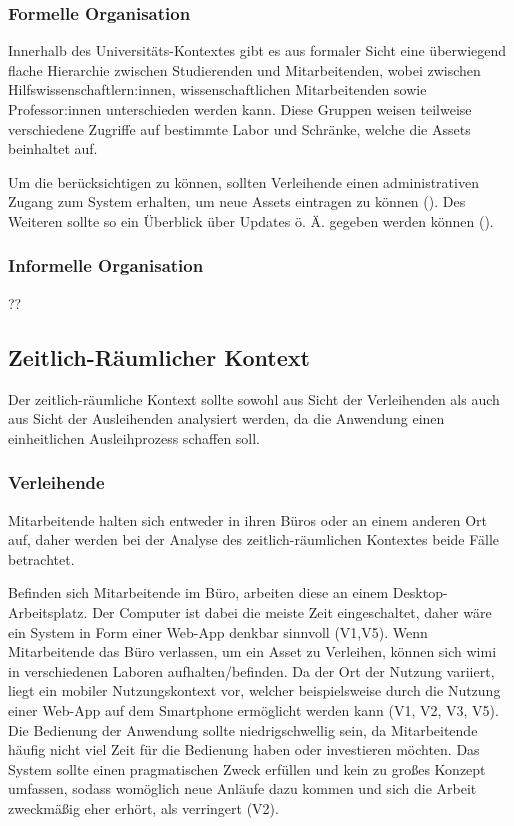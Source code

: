 \subsubsection{Formelle Organisation}
Innerhalb des Universitäts-Kontextes gibt es aus formaler Sicht eine überwiegend flache Hierarchie
zwischen Studierenden und Mitarbeitenden, wobei zwischen Hilfswissenschaftlern:innen,
wissenschaftlichen Mitarbeitenden sowie Professor:innen unterschieden werden kann. Diese Gruppen
weisen teilweise verschiedene Zugriffe auf bestimmte Labor und Schränke, welche die Assets
beinhaltet auf.

Um die  berücksichtigen zu können, sollten Verleihende einen administrativen
Zugang zum System erhalten, um neue Assets eintragen zu können ().
Des Weiteren sollte so ein Überblick über Updates ö. Ä. gegeben werden können
(). 

\subsubsection{Informelle Organisation}
??
\subsection{Zeitlich-Räumlicher Kontext}
\label{section:zeit}
Der zeitlich-räumliche Kontext sollte sowohl aus Sicht der Verleihenden als auch aus Sicht der
Ausleihenden analysiert werden, da die Anwendung einen einheitlichen Ausleihprozess schaffen soll. 

\subsubsection{Verleihende}
Mitarbeitende halten sich entweder in ihren Büros oder an einem anderen Ort auf, daher werden bei
der Analyse des zeitlich-räumlichen Kontextes beide Fälle betrachtet.

Befinden sich Mitarbeitende im Büro, arbeiten diese an einem Desktop-Arbeitsplatz. Der Computer ist
dabei die meiste Zeit eingeschaltet, daher wäre ein System in Form einer Web-App denkbar sinnvoll
(V1,V5). Wenn Mitarbeitende das Büro verlassen, um ein Asset zu Verleihen, können sich \ac{wimi} in
verschiedenen Laboren aufhalten/befinden. Da der Ort der Nutzung variiert, liegt ein mobiler
Nutzungskontext vor, welcher beispielsweise durch die Nutzung einer Web-App auf dem Smartphone
ermöglicht werden kann (V1, V2, V3, V5). Die Bedienung der Anwendung sollte niedrigschwellig sein,
da Mitarbeitende häufig nicht viel Zeit für die Bedienung haben oder investieren möchten. Das System
sollte einen pragmatischen Zweck erfüllen und kein zu großes Konzept umfassen, sodass womöglich neue
Anläufe dazu kommen und sich die Arbeit zweckmäßig eher erhört, als verringert (V2).

